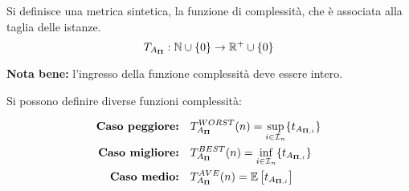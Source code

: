 Si definisce una metrica sintetica, la funzione di complessità, che è associata alla taglia delle istanze.
$$ T_{A_{\bm{\Pi}{}}} : \mathbb{N} \cup \{0\} \to \mathbb{R}^{+} \cup \{0\}$$

\textbf{Nota bene:} l'ingresso della funzione complessità deve essere intero.

Si possono definire diverse funzioni complessità:

\begin{align*}
\textrm{\textbf{Caso peggiore:}} &\quad T_{A_{\bm{\Pi}{}}}^{WORST} (n) = \sup_{i \in \mathcal{I}{}_{n}} \{t_{A_{\bm{\Pi}{},i}} \} \\
\textrm{\textbf{Caso migliore:}} &\quad T_{A_{\bm{\Pi}{}}}^{BEST} (n) = \inf_{i \in \mathcal{I}{}_{n}} \{t_{A_{\bm{\Pi}{},i}} \} \\
\textrm{\textbf{Caso medio:}} &\quad T_{A_{\bm{\Pi}{}}}^{AVE} (n) = \mathbb{E} \left[t_{A_{\bm{\Pi}{},i}} \right]
\end{align*}

